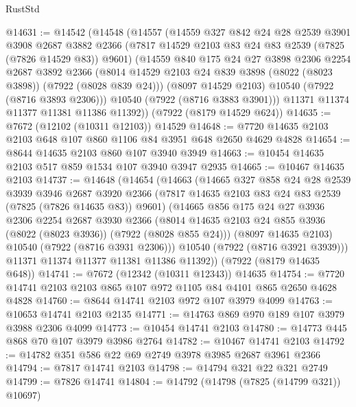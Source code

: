 \begin{lexlean}{RustStd}
\begin{coremodule}
@14631 := @14542
    (@14548
      (@14557
        (@14559
          @327
          @842
          @24
          @28
          @2539
          @3901
          @3908
          @2687
          @3882
          @2366
          (@7817 @14529 @2103 @83 @24 @83 @2539 (@7825 (@7826 @14529 @83)) @9601)
          (@14559
            @840
            @175
            @24
            @27
            @3898
            @2306
            @2254
            @2687
            @3892
            @2366
            (@8014 @14529 @2103 @24 @839 @3898 (@8022 (@8023 @3898)) (@7922 (@8028 @839 @24)))
            (@8097 @14529 @2103)
            @10540
            (@7922 (@8716 @3893 @2306)))
          @10540
          (@7922 (@8716 @3883 @3901)))
        @11371
        @11374
        @11377
        @11381
        @11386
        @11392))
    (@7922 (@8179 @14529 @624))
@14635 := @7672 (@12102 (@10311 @12103)) @14529
@14648 := @7720 @14635 @2103 @2103 @648 @107 @860 @1106 @84 @3951 @648 @2650 @4629 @4828
@14654 := @8644 @14635 @2103 @860 @107 @3940 @3949
@14663 := @10454 @14635 @2103 @517 @859 @1534 @107 @3940 @3947 @2935
@14665 := @10467 @14635 @2103
@14737 := @14648
    (@14654
      (@14663
        (@14665
          @327
          @858
          @24
          @28
          @2539
          @3939
          @3946
          @2687
          @3920
          @2366
          (@7817 @14635 @2103 @83 @24 @83 @2539 (@7825 (@7826 @14635 @83)) @9601)
          (@14665
            @856
            @175
            @24
            @27
            @3936
            @2306
            @2254
            @2687
            @3930
            @2366
            (@8014 @14635 @2103 @24 @855 @3936 (@8022 (@8023 @3936)) (@7922 (@8028 @855 @24)))
            (@8097 @14635 @2103)
            @10540
            (@7922 (@8716 @3931 @2306)))
          @10540
          (@7922 (@8716 @3921 @3939)))
        @11371
        @11374
        @11377
        @11381
        @11386
        @11392))
    (@7922 (@8179 @14635 @648))
@14741 := @7672 (@12342 (@10311 @12343)) @14635
@14754 := @7720 @14741 @2103 @2103 @865 @107 @972 @1105 @84 @4101 @865 @2650 @4628 @4828
@14760 := @8644 @14741 @2103 @972 @107 @3979 @4099
@14763 := @10653 @14741 @2103 @2135
@14771 := @14763 @869 @970 @189 @107 @3979 @3988 @2306 @4099
@14773 := @10454 @14741 @2103
@14780 := @14773 @445 @868 @70 @107 @3979 @3986 @2764
@14782 := @10467 @14741 @2103
@14792 := @14782 @351 @586 @22 @69 @2749 @3978 @3985 @2687 @3961 @2366
@14794 := @7817 @14741 @2103
@14798 := @14794 @321 @22 @321 @2749
@14799 := @7826 @14741
@14804 := @14792 (@14798 (@7825 (@14799 @321)) @10697)

\end{coremodule}
\end{lexlean}
